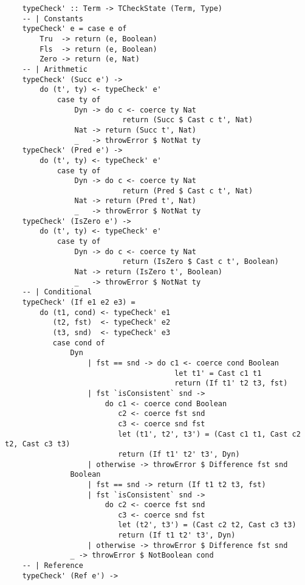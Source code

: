 \begin{lstlisting}
    typeCheck' :: Term -> TCheckState (Term, Type)
    -- | Constants
    typeCheck' e = case e of                              
        Tru  -> return (e, Boolean)                                    
        Fls  -> return (e, Boolean)                                   
        Zero -> return (e, Nat)     
    -- | Arithmetic                              
    typeCheck' (Succ e') -> 
        do (t', ty) <- typeCheck' e'
            case ty of  
                Dyn -> do c <- coerce ty Nat
                           return (Succ $ Cast c t', Nat)
                Nat -> return (Succ t', Nat)
                _   -> throwError $ NotNat ty
    typeCheck' (Pred e') -> 
        do (t', ty) <- typeCheck' e'
            case ty of
                Dyn -> do c <- coerce ty Nat
                           return (Pred $ Cast c t', Nat)
                Nat -> return (Pred t', Nat)
                _   -> throwError $ NotNat ty
    typeCheck' (IsZero e') -> 
        do (t', ty) <- typeCheck' e' 
            case ty of 
                Dyn -> do c <- coerce ty Nat
                           return (IsZero $ Cast c t', Boolean)
                Nat -> return (IsZero t', Boolean)
                _   -> throwError $ NotNat ty
    -- | Conditional
    typeCheck' (If e1 e2 e3) = 
        do (t1, cond) <- typeCheck' e1 
           (t2, fst)  <- typeCheck' e2 
           (t3, snd)  <- typeCheck' e3
           case cond of 
               Dyn 
                   | fst == snd -> do c1 <- coerce cond Boolean
                                       let t1' = Cast c1 t1
                                       return (If t1' t2 t3, fst)  
                   | fst `isConsistent` snd -> 
                       do c1 <- coerce cond Boolean
                          c2 <- coerce fst snd
                          c3 <- coerce snd fst 
                          let (t1', t2', t3') = (Cast c1 t1, Cast c2 t2, Cast c3 t3)
                          return (If t1' t2' t3', Dyn)   
                   | otherwise -> throwError $ Difference fst snd
               Boolean 
                   | fst == snd -> return (If t1 t2 t3, fst) 
                   | fst `isConsistent` snd -> 
                       do c2 <- coerce fst snd 
                          c3 <- coerce snd fst
                          let (t2', t3') = (Cast c2 t2, Cast c3 t3)
                          return (If t1 t2' t3', Dyn) 
                   | otherwise -> throwError $ Difference fst snd
               _ -> throwError $ NotBoolean cond      
    -- | Reference
    typeCheck' (Ref e') -> 

\end{lstlisting}
